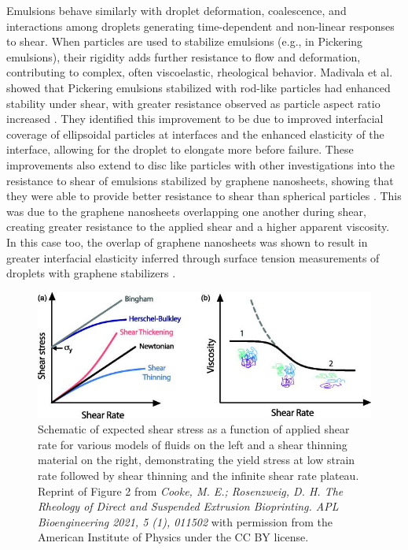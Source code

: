 Emulsions behave similarly with droplet deformation, coalescence, and interactions 
among droplets generating time-dependent and non-linear responses to shear. When particles are used to stabilize emulsions (e.g., in Pickering emulsions), their rigidity 
adds further resistance to flow and deformation, contributing to complex, often viscoelastic, rheological behavior.
Madivala et al. showed that Pickering emulsions stabilized with rod-like particles had enhanced stability under shear, with greater resistance observed as particle aspect ratio increased 
\cite{madivala_exploiting_2009}. They identified this improvement to be due to improved interfacial coverage of ellipsoidal particles at interfaces and the enhanced elasticity of the interface,
allowing for the droplet to elongate more before failure. These improvements also extend to disc like particles with other investigations into the resistance to shear of emulsions stabilized by
graphene nanosheets, showing that they were able to provide better resistance to shear than spherical particles \cite{imperiali_simple_2014}. This was due to the graphene nanosheets overlapping one
another during shear, creating greater resistance to the applied shear and a higher apparent viscosity. In this case too, the overlap of graphene nanosheets was shown to result in greater interfacial
elasticity inferred through surface tension measurements of droplets with graphene stabilizers \cite{sun_assembly_2013}.

\begin{figure}
    \centering
    \includegraphics[scale = 4]{../figures/literature_review/Flow-curves.png}
    \caption{Schematic of expected shear stress as a function of applied shear rate for various models of fluids on the left and a shear thinning material on the right, demonstrating
             the yield stress at low strain rate followed by shear thinning and the infinite shear rate plateau. Reprint of Figure 2 from
             \textit{Cooke, M. E.; Rosenzweig, D. H. The Rheology of Direct and Suspended Extrusion Bioprinting. APL Bioengineering 2021, 5 (1), 011502} 
             with permission from the American Institute of Physics under the CC BY license.}
    \label{fig:shear_theory}
\end{figure}


